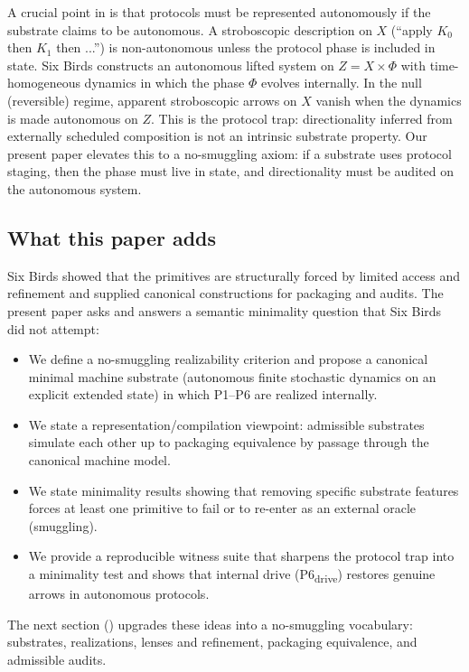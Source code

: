 \documentclass[11pt]{article}
\theoremstyle{definition}
\theoremstyle{remark}
\begin{document}
A crucial point in \citet{sixbirds2026} is that protocols must be represented autonomously if the substrate claims to be autonomous.
A stroboscopic description on $X$ (``apply $K_0$ then $K_1$ then ...'') is non-autonomous unless the protocol phase is included in state.
Six Birds constructs an autonomous lifted system on $Z=X\times\Phi$ with time-homogeneous dynamics in which the phase $\Phi$ evolves internally.
In the null (reversible) regime, apparent stroboscopic arrows on $X$ vanish when the dynamics is made autonomous on $Z$.
This is the protocol trap: directionality inferred from externally scheduled composition is not an intrinsic substrate property.
Our present paper elevates this to a no-smuggling axiom: if a substrate uses protocol staging, then the phase must live in state, and directionality must be audited on the autonomous system.

\subsection{What this paper adds}

Six Birds showed that the primitives are structurally forced by limited access and refinement and supplied canonical constructions for packaging and audits.
The present paper asks and answers a semantic minimality question that Six Birds did not attempt:

\begin{itemize}[leftmargin=*, itemsep=0.25em]
  \item We define a no-smuggling realizability criterion and propose a canonical minimal machine substrate (autonomous finite stochastic dynamics on an explicit extended state) in which P1--P6 are realized internally.
  \item We state a representation/compilation viewpoint: admissible substrates simulate each other up to packaging equivalence by passage through the canonical machine model.
  \item We state minimality results showing that removing specific substrate features forces at least one primitive to fail or to re-enter as an external oracle (smuggling).
  \item We provide a reproducible witness suite that sharpens the protocol trap into a minimality test and shows that internal drive (P6\textsubscript{drive}) restores genuine arrows in autonomous protocols.
\end{itemize}

The next section () upgrades these ideas into a no-smuggling vocabulary: substrates, realizations, lenses and refinement, packaging equivalence, and admissible audits.
\end{document}
